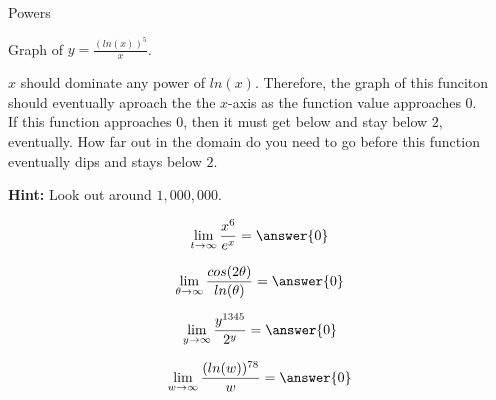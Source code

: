 \documentclass{ximera}
\begin{document}
\begin{example} Powers


Graph of $y = \frac{(ln(x))^5}{x}$.

$x$ should dominate any power of $ln(x)$.  Therefore, the graph of this funciton should eventually aproach the the $x$-axis as the function value approaches $0$. \\


If this function approaches $0$, then it must get below and stay below $2$, eventually. How far out in the domain do you need to go before this function eventually dips and stays below $2$.


\begin{center}
\end{center}




\textbf{Hint:} Look out around $1,000,000$.

\end{example}



\begin{question}

\[
\lim\limits_{t \to \infty} \frac{x^6}{e^x} = \answer{0}
\]

\end{question}









\begin{question}

\[
\lim\limits_{\theta \to \infty} \frac{cos(2 \theta)}{ln(\theta)} = \answer{0}
\]

\end{question}









\begin{question}

\[
\lim\limits_{y \to \infty} \frac{y^{1345}}{2^y} = \answer{0}
\]

\end{question}












\begin{question}

\[
\lim\limits_{w \to \infty} \frac{(ln(w))^{78}}{w} = \answer{0}
\]

\end{question}
\end{document}
